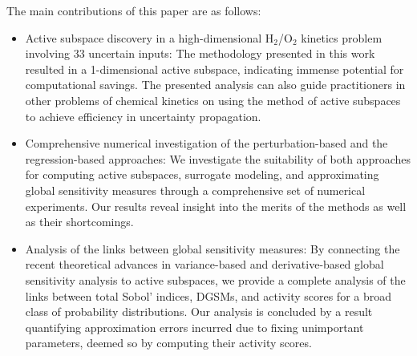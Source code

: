 The main contributions of this paper are as follows: 
\begin{itemize}
\item 
Active subspace
discovery in a high-dimensional H$_2$/O$_2$ kinetics problem involving 33
uncertain inputs: The methodology presented in this work
resulted in a 1-dimensional active subspace, indicating immense potential
for computational savings. The presented
analysis can also guide practitioners in other problems of chemical kinetics on using the
method of active subspaces to achieve efficiency in uncertainty propagation.  
\item Comprehensive numerical investigation of the perturbation-based and the regression-based approaches: 
We investigate the suitability of both approaches
for computing active subspaces, surrogate modeling, and approximating global
sensitivity measures through a comprehensive set of numerical experiments. Our
results reveal insight into the merits of the methods as well as
their shortcomings.  
\item Analysis of the links between  
global sensitivity measures: 
By connecting the recent theoretical advances in variance-based and
derivative-based global sensitivity analysis to active subspaces, we provide a complete analysis
of the links between total Sobol' indices, DGSMs, and activity scores for a broad
class of probability distributions. Our analysis is concluded by a result quantifying
approximation errors incurred due to fixing unimportant parameters, deemed so by 
computing their activity scores.  

\end{itemize}

